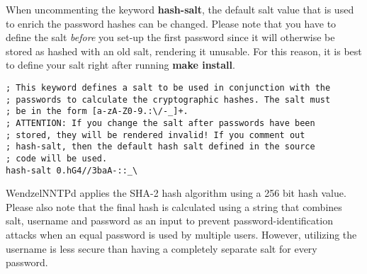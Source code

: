 When uncommenting the keyword \textbf{hash-salt}, the default salt value that is used to enrich the password hashes can be changed. Please note that you have to define the salt \textit{before} you set-up the first password since it will otherwise be stored as hashed with an old salt, rendering it unusable. For this reason, it is best to define your salt right after running \textbf{make install}.

\begin{verbatim}
; This keyword defines a salt to be used in conjunction with the
; passwords to calculate the cryptographic hashes. The salt must
; be in the form [a-zA-Z0-9.:\/-_]+.
; ATTENTION: If you change the salt after passwords have been
; stored, they will be rendered invalid! If you comment out
; hash-salt, then the default hash salt defined in the source
; code will be used.
hash-salt 0.hG4//3baA-::_\
\end{verbatim}

WendzelNNTPd applies the SHA-2 hash algorithm using a 256 bit hash value. Please also note that the final hash is calculated using a string that combines salt, username and password as an input to prevent password-identification attacks when an equal password is used by multiple users. However, utilizing the username is less secure than having a completely separate salt for every password.


